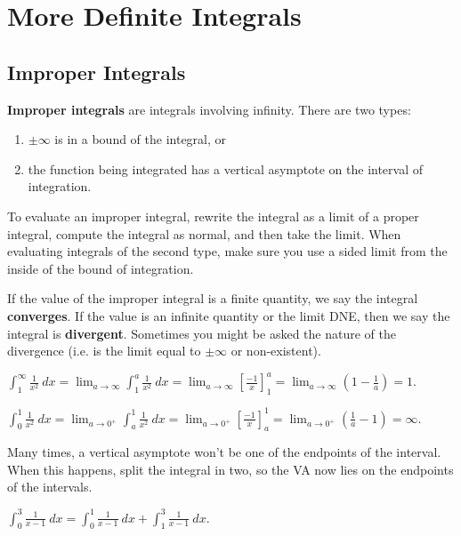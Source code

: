 \section{More Definite Integrals}
\label{sec:more-definite-integrals}

\subsection{Improper Integrals}

\textbf{Improper integrals} are integrals involving infinity. There are two types:
\begin{enumerate}
    \item $\pm\infty$ is in a bound of the integral, or
    \item the function being integrated has a vertical asymptote on the interval of integration.
\end{enumerate}


To evaluate an improper integral, rewrite the integral as a limit of a proper integral, compute the integral as normal, and then take the limit. When evaluating integrals of the second type, make sure you use a sided limit from the inside of the bound of integration.

If the value of the improper integral is a finite quantity, we say the integral \textbf{converges}. If the value is an infinite quantity or the limit DNE, then we say the integral is \textbf{divergent}. Sometimes you might be asked the nature of the divergence (i.e. is the limit equal to $\pm\infty$ or non-existent).

\begin{exampleblock}
    $\displaystyle \int_1^\infty \frac{1}{x^2}\ dx
     = \lim_{a\to \infty}\int_1^a \frac{1}{x^2}\ dx 
     = \lim_{a\to \infty}\left[\frac{-1}{x}\right]_1^a 
     = \lim_{a\to \infty} \left(1-\frac{1}{a}\right)
    =1.$
\end{exampleblock}
\begin{exampleblock}
    $\displaystyle\int_{0}^{1}\frac{1}{x^{2}}\ dx
     = \lim_{a\to 0^+} \int_{a}^{1}\frac{1}{x^{2}}\ dx 
     = \lim_{a\to 0^+}\left[\frac{-1}{x}\right]_a^1 
     = \lim_{a\to 0^+}\left(\frac{1}{a}-1\right)
     = \infty.$
\end{exampleblock}


Many times, a vertical asymptote won't be one of the endpoints of the interval. When this happens, split the integral in two, so the VA now lies on the endpoints of the intervals.
\begin{exampleblock}
	$\displaystyle \int_0^3 \frac{1}{x-1} \ dx = \int_0^1 \frac{1}{x-1} \ dx + \int_1^3 \frac{1}{x-1} \ dx$.
\end{exampleblock}



